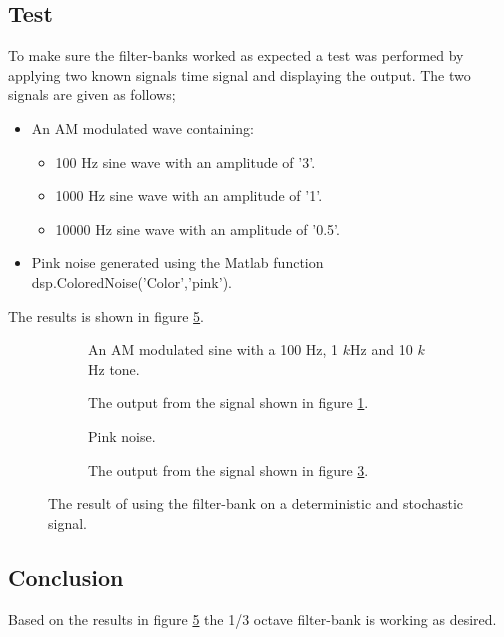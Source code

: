 \subsection{Test}

To make sure the filter-banks worked as expected a test was performed by applying two known signals time signal and displaying the output. The two signals are given as follows;
\vspace{-6mm}
\begin{itemize}
	\item An AM modulated wave containing:
	\begin{itemize}
		\item 100 Hz sine wave with an amplitude of '3'.
		\item 1000 Hz sine wave with an amplitude of '1'.
		\item 10000 Hz sine wave with an amplitude of '0.5'.
	\end{itemize}
	\item Pink noise generated using the Matlab function dsp.ColoredNoise('Color','pink').
\end{itemize}
\vspace{-3mm}
The results is shown in figure \ref{fig:octresults}. 

\begin{figure}[H]
	\centering
	\begin{subfigure}[b]{0.45\textwidth}
		\centering
			
		\caption{An AM modulated sine with a 100 Hz, 1 $k$Hz and 10 $k$Hz tone.}
		\label{fig:Signal01k1k10k}
	\end{subfigure}
	\hfill
	\begin{subfigure}[b]{0.45\textwidth}
		\centering
			
		\caption{The output from the signal shown in figure \ref{fig:Signal01k1k10k}.}
		\label{fig:OctFilter01k1k10k}
	\end{subfigure}	
	\begin{subfigure}[b]{0.45\textwidth}
		\centering
			
		\caption{Pink noise.}
		\label{fig:PinkNoise5sec}
	\end{subfigure}	
	\hfill
	\begin{subfigure}[b]{0.45\textwidth}
		\centering
		
		\caption{The output from the signal shown in figure \ref{fig:PinkNoise5sec}.}
		\label{fig:OctFilterPink}
	\end{subfigure}	
	\caption{The result of using the filter-bank on a deterministic and stochastic signal.}
	\label{fig:octresults}
\end{figure}

\subsection{Conclusion}
Based on the results in figure \ref{fig:octresults} the 1/3 octave filter-bank is working as desired.
